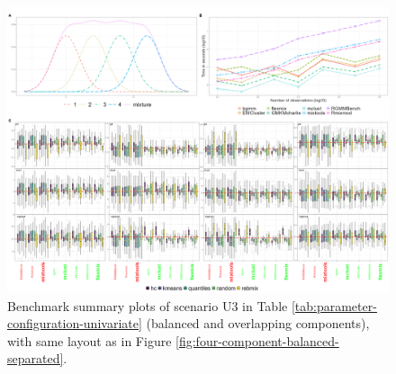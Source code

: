 \begin{figure}

{\centering \includegraphics[width=1\linewidth]{./figs/univariate/univariate_balanced_overlapping} 

}

\caption{Benchmark summary plots of scenario U3 in Table \ref{tab:parameter-configuration-univariate} (balanced and overlapping components), with same layout as in Figure \ref{fig:four-component-balanced-separated}.}\label{fig:four-component-balanced-overlapping}
\end{figure}

\newpage

